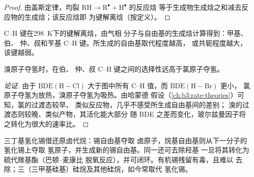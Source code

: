 \begin{proof}
由盖斯定律，均裂 $\mathrm{RH \to R^\bullet + H^\bullet}$ 的反应焓
等于生成物生成焓之和减去反应物的生成焓；该反应焓即
为键解离焓（按定义）。
\end{proof}

\begin{omfigure}

{\small C--H 键在\qty{298}{K}下的键解离焓，由气相
分子与自由基的生成焓计算得到：甲基、伯、
仲、叔和苄基 C--H 键。所生成的自由基取代程度越高，
或共轭程度越大，该键越弱。}
\end{omfigure}

\begin{proposition}[卤代反应的选择性]\label{prop:b3:radicals-carbenes:halogenation-selectivity}
溴原子夺氢时，在伯、
仲、叔 C--H 键之间的选择性远高于氯原子夺氢。
\end{proposition}

\begin{proof}[论证]
由于 $\mathrm{BDE(H{-}Cl)}$ 大于图中所有 C--H 值，而 $\mathrm{BDE(H{-}Br)}$ 更小，
氯原子夺氢为放热，溴原子夺氢为吸热。由哈蒙德
假设（\cref{ch:b3:rate-theories}）可知，氯的过渡态较早、
类似反应物，几乎不感受所生成自由基间的差别；
溴的过渡态则较晚、类似产物，其活化能大部分
随 BDE 之差而变化，玻尔兹曼因子将之转化为很大的速率比。
\end{proof}

三丁基氢化锡借还原卤代烷：锡自由基夺取
卤原子，烷基自由基则从下一分子的氢化锡上夺取
氢原子，并生成新的锡自由基。同一还可去除羟基
一旦将其转化为硫代羰基酯（巴顿–麦康比
脱氧反应），并可闭环。有机锡残留有毒，且难以
去除；三（三甲基硅基）硅烷及其他硅烷，如今常取代
氢化锡。

